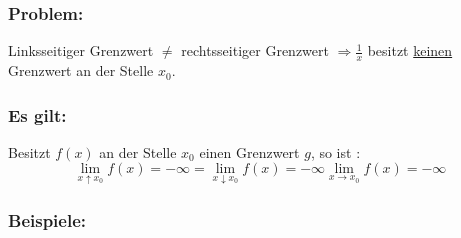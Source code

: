 \documentclass[11pt]{amsart}
\theoremstyle{remark}
\begin{document}
\subsubsection*{Problem:}
Linksseitiger Grenzwert $\ne$ rechtsseitiger Grenzwert $\Rightarrow \frac 1x$ besitzt \underline{keinen} Grenzwert an der Stelle $x_0$.
\subsubsection*{Es gilt:\\}
Besitzt $f(x)$ an der Stelle $x_0$ einen Grenzwert $g$, so ist :
\begin{equation}
\lim_{x \uparrow x_0} f(x) = -\infty = \lim_{x \downarrow x_0} f(x) = -\infty \lim_{x \to x_0} f(x) = -\infty
\end{equation}
\subsubsection*{Beispiele:}
\end{document}
